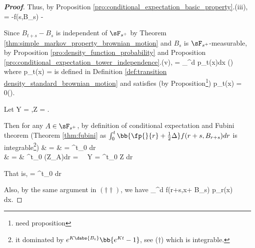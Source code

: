 \begin{proof}[\bf Proof]
Thus, by Proposition \ref{pro:conditional_expectation_basic_property}.(iii),
\be
\E{} = \E{} -f(s,B_s) - \E{}
\ee


Since $B_{t+s} - B_s$ is independent of $\sF_{s^+}$ by Theorem \ref{thm:simple_markov_property_brownian_motion} and $B_s$ is $\sF_{s^+}$-measurable, by Proposition \ref{pro:density_function_probability} and Proposition \ref{pro:conditional_expectation_tower_independence}.(v),
\be
\E{} = \E{}   \int_{\R^d}  p_t(x)dx \qquad (\dag\dag)
\ee
where
\be
p_t(x) =  \exp{}
\ee
is defined in Definition \ref{def:transition density_standard_brownian_motion} and satisfies (by Proposition\footnote{need proposition})
\be
{} p_t(x) = 0\qquad (\dag\dag\dag).
\ee

Let
\be
Y = \E{},\qquad Z = \E{}.
\ee

Then for any $A\in \sF_{s^+}$, by definition of conditional expectation and Fubini theorem (Theorem \ref{thm:fubini} as $\int^t_0\bb{\fp{}{r} + \frac 12 \Delta}f(r+s,B_{r+s})dr$ is integrable\footnote{it dominated by $e^{K\dabs{B_t}} \bb{e^{Kt}-1}$, see ($\dag$) which is integrable.})
\beast
\E{} & = & \E{} = \int^{t}_0 \E{} dr\\
& = & \int^t_0 \E(Z\ind_A)dr = \E{} \ \ra \ Y = \int^t_0 Z dr 
\eeast

That is,
\be
\E{} = \int^t_0 \E{} dr 
\ee

Also, by the same argument in $(\dag\dag)$, we have
\be
\E{}   \int_{\R^d} f(r+s,x+ B_s) p_r(x) dx.
\ee


\end{proof}
